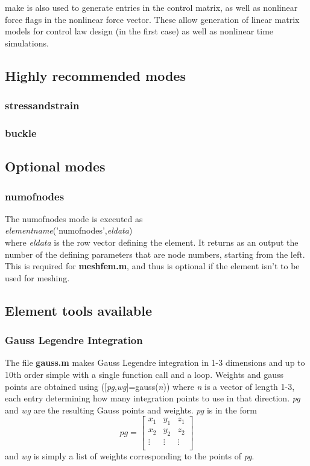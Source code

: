 \documentclass[12pt]{article}
\newcommand*{\sarg}[1]{\textit{#1}}
\newcommand*{\command}[1]{\textsf{#1}}
\newcommand*{\filename}[1]{\textsf{\textbf{#1}}}
\newcommand*{\varg}[1]{\textit{#1}}
\begin{document}
\command{make} is also used to generate entries in the control matrix,
as well as nonlinear force flags in the nonlinear force vector. These
allow generation of linear matrix models for control law design (in
the first case) as well as nonlinear time simulations.
\subsection{Highly recommended modes}
\subsubsection{\command{stressandstrain}}
\subsubsection{\command{buckle}}
\subsection{Optional modes}
\subsubsection{numofnodes}
The \command{numofnodes} mode is executed as\\
\varg{elementname}\command{('numofnodes',}\varg{eldata}\command{)}\\
where \varg{eldata} is the row vector defining the element. It returns
as an output the number of the defining parameters that are node
numbers, starting from the left. This is required for
\filename{meshfem.m}, and thus is optional if the element isn't to be
used for meshing.
\subsection{Element tools available}
\subsubsection{Gauss Legendre Integration}
The file \filename{gauss.m} makes Gauss Legendre integration in 1-3
dimensions and up to 10th order simple with a single function call and
a loop. Weights and gauss points are obtained using
\command{([}\sarg{pg}\command{,}\sarg{wg}\command{]=gauss(}\sarg{n}\command{))}
where \sarg{n} is a vector of length 1-3, each entry determining how
many integration points to use in that direction. \sarg{pg} and
\sarg{wg} are the resulting Gauss points and weights. \sarg{pg} is in
the form
\begin{displaymath}
pg=\begin{bmatrix}
x_{1}&y_{1}&z_{1}\\
x_{2}&y_{2}&z_{2}\\
\vdots&\vdots&\vdots\\
\end{bmatrix}
\end{displaymath}and \sarg{wg} is simply a list of weights corresponding to the points of \sarg{pg}.
\end{document}
